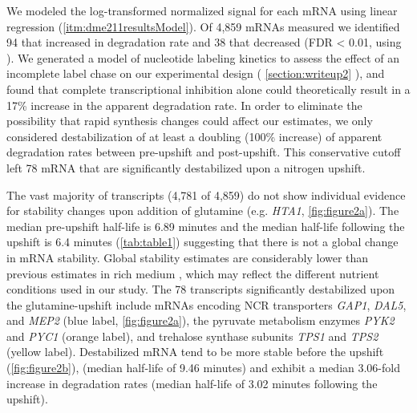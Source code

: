 We modeled the
log-transformed normalized signal for each mRNA using linear
regression (\autoref{itm:dme211resultsModel}).
Of 4,859 mRNAs measured we identified 94 that increased in 
degradation rate and 38 that decreased (FDR < 0.01, using
\cite{storey2003statistical}). 
We generated a model of nucleotide
labeling kinetics to assess the effect of an incomplete label 
chase on our experimental design ( \autoref{section:writeup2} ),
 and found that complete transcriptional inhibition alone could 
theoretically result in a 17\% increase in the apparent 
degradation rate. In order to eliminate the possibility that
rapid synthesis changes could affect our estimates,
we only considered destabilization of at least a
doubling (100\% increase) of apparent degradation rates between 
pre-upshift and post-upshift.
This conservative cutoff 
left 78 mRNA that are significantly destabilized 
upon a nitrogen upshift. 

The vast majority of transcripts (4,781 of 4,859) do not show
individual evidence for stability changes upon addition of glutamine
(e.g. \textit{HTA1}, \autoref{fig:figure2a}). 
The median pre-upshift half-life is 6.89 minutes and the median
half-life following the upshift is 6.4 minutes (\autoref{tab:table1})
suggesting that there is not a global change in mRNA stability.
Global stability estimates are
considerably lower than previous estimates in rich medium
\parencite{munchel2011dynamic,neymotin2014determination,miller2011dynamic}, 
which may reflect the
different nutrient conditions used in our study. 
The 78 transcripts significantly destabilized upon the 
glutamine-upshift include
mRNAs encoding NCR transporters \textit{GAP1}, \textit{DAL5}, and
\textit{MEP2} (blue label, \autoref{fig:figure2a}), the pyruvate metabolism enzymes
\textit{PYK2} and \textit{PYC1} (orange label), and trehalose synthase
subunits \textit{TPS1} and
\textit{TPS2} (yellow label).
Destabilized mRNA tend to be more stable before the upshift
(\autoref{fig:figure2b}),
(median half-life of 9.46 minutes) and exhibit 
a median 3.06-fold increase in degradation rates (median half-life of
3.02 minutes following the upshift). 

